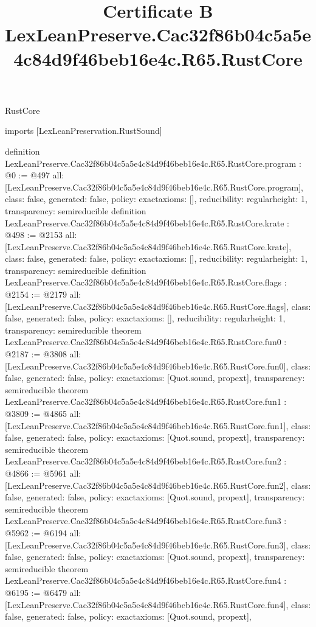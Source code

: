 \begin{lexlean}{RustCore}
\title{Certificate B LexLeanPreserve.Cac32f86b04c5a5e4c84d9f46beb16e4c.R65.RustCore}
\begin{coremodule}
imports [LexLeanPreservation.RustSound]

definition LexLeanPreserve.Cac32f86b04c5a5e4c84d9f46beb16e4c.R65.RustCore.program : @0 := @497 {
  all: [LexLeanPreserve.Cac32f86b04c5a5e4c84d9f46beb16e4c.R65.RustCore.program],
  class: false,
  generated: false,
  policy: exact{axioms: []},
  reducibility: regular{height: 1},
  transparency: semireducible
}
definition LexLeanPreserve.Cac32f86b04c5a5e4c84d9f46beb16e4c.R65.RustCore.krate : @498 := @2153 {
  all: [LexLeanPreserve.Cac32f86b04c5a5e4c84d9f46beb16e4c.R65.RustCore.krate],
  class: false,
  generated: false,
  policy: exact{axioms: []},
  reducibility: regular{height: 1},
  transparency: semireducible
}
definition LexLeanPreserve.Cac32f86b04c5a5e4c84d9f46beb16e4c.R65.RustCore.flags : @2154 := @2179 {
  all: [LexLeanPreserve.Cac32f86b04c5a5e4c84d9f46beb16e4c.R65.RustCore.flags],
  class: false,
  generated: false,
  policy: exact{axioms: []},
  reducibility: regular{height: 1},
  transparency: semireducible
}
theorem LexLeanPreserve.Cac32f86b04c5a5e4c84d9f46beb16e4c.R65.RustCore.fun0 : @2187 := @3808 {
  all: [LexLeanPreserve.Cac32f86b04c5a5e4c84d9f46beb16e4c.R65.RustCore.fun0],
  class: false,
  generated: false,
  policy: exact{axioms: [Quot.sound, propext]},
  transparency: semireducible
}
theorem LexLeanPreserve.Cac32f86b04c5a5e4c84d9f46beb16e4c.R65.RustCore.fun1 : @3809 := @4865 {
  all: [LexLeanPreserve.Cac32f86b04c5a5e4c84d9f46beb16e4c.R65.RustCore.fun1],
  class: false,
  generated: false,
  policy: exact{axioms: [Quot.sound, propext]},
  transparency: semireducible
}
theorem LexLeanPreserve.Cac32f86b04c5a5e4c84d9f46beb16e4c.R65.RustCore.fun2 : @4866 := @5961 {
  all: [LexLeanPreserve.Cac32f86b04c5a5e4c84d9f46beb16e4c.R65.RustCore.fun2],
  class: false,
  generated: false,
  policy: exact{axioms: [Quot.sound, propext]},
  transparency: semireducible
}
theorem LexLeanPreserve.Cac32f86b04c5a5e4c84d9f46beb16e4c.R65.RustCore.fun3 : @5962 := @6194 {
  all: [LexLeanPreserve.Cac32f86b04c5a5e4c84d9f46beb16e4c.R65.RustCore.fun3],
  class: false,
  generated: false,
  policy: exact{axioms: [Quot.sound, propext]},
  transparency: semireducible
}
theorem LexLeanPreserve.Cac32f86b04c5a5e4c84d9f46beb16e4c.R65.RustCore.fun4 : @6195 := @6479 {
  all: [LexLeanPreserve.Cac32f86b04c5a5e4c84d9f46beb16e4c.R65.RustCore.fun4],
  class: false,
  generated: false,
  policy: exact{axioms: [Quot.sound, propext]},
}
\end{coremodule}
\end{lexlean}
